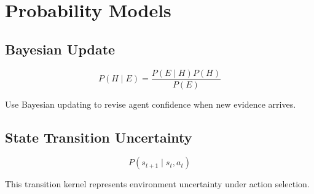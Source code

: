 \section*{Probability Models}

\subsection*{Bayesian Update}
\[
P(H\mid E)=\frac{P(E\mid H)P(H)}{P(E)}
\]

Use Bayesian updating to revise agent confidence when new evidence arrives.

\subsection*{State Transition Uncertainty}
\[
P(s_{t+1}\mid s_t,a_t)
\]

This transition kernel represents environment uncertainty under action selection.
